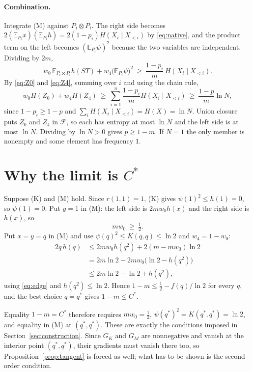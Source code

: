 \documentclass[aps,prd,twocolumn,superscriptaddress,nofootinbib,longbibliography,floatfix,amsmath,amssymb,10pt]{revtex4-2}
\theoremstyle{plain}
\theoremstyle{definition}
\theoremstyle{plain}
\newcommand{\EE}{\mathbb{E}}
\newcommand{\cF}{\mathcal{F}}
\newcommand{\qs}{q^{*}}
\newcommand{\Cs}{C^{*}}
\begin{document}
\paragraph*{Combination.} Integrate (M) against $P_i\otimes P_i$. The right side becomes $2(\EE_{P_i}x)(\EE_{P_i}h)=2(1-p_i)H(X_i\mid X_{<i})$ by \eqref{eq:native}, and the product term on the left becomes $(\EE_{P_i}\psi)^2$ because the two variables are independent. Dividing by $2m$,
\[
w_0\,\EE_{P_i\otimes P_i}h(ST)+w_4\bigl(\EE_{P_i}\psi\bigr)^2\ \ge\ \frac{1-p_i}{m}\,H(X_i\mid X_{<i}).
\]
By \eqref{eq:Z0} and \eqref{eq:Z4}, summing over $i$ and using the chain rule,
\[
w_0H(Z_0)+w_4H(Z_4)\ \ge\ \sum_{i=1}^n\frac{1-p_i}{m}H(X_i\mid X_{<i})\ \ge\ \frac{1-p}{m}\ln N,
\]
since $1-p_i\ge 1-p$ and $\sum_iH(X_i\mid X_{<i})=H(X)=\ln N$. Union closure puts $Z_0$ and $Z_4$ in $\cF$, so each has entropy at most $\ln N$ and the left side is at most $\ln N$. Dividing by $\ln N>0$ gives $p\ge 1-m$. If $N=1$ the only member is nonempty and some element has frequency $1$.

\section{Why the limit is \texorpdfstring{$\Cs$}{C*}}\label{app:limit}

Suppose (K) and (M) hold. Since $r(1,1)=1$, (K) gives $\psi(1)^2\le h(1)=0$, so $\psi(1)=0$. Put $y=1$ in (M): the left side is $2mw_0h(x)$ and the right side is $h(x)$, so
\begin{equation}\label{eq:edge}
mw_0\ \ge\ \tfrac12 .
\end{equation}
Put $x=y=q$ in (M) and use $\psi(q)^2\le K(q,q)\le\ln 2$ and $w_4=1-w_0$:
\begin{align*}
2q\,h(q)&\le 2mw_0h(q^2)+2(m-mw_0)\ln 2\\
&= 2m\ln2-2mw_0\bigl(\ln2-h(q^2)\bigr)\\
&\le 2m\ln 2-\ln2+h(q^2),
\end{align*}
using \eqref{eq:edge} and $h(q^2)\le\ln 2$. Hence $1-m\le\frac12-f(q)/\ln2$ for every $q$, and the best choice $q=\qs$ gives $1-m\le\Cs$.

Equality $1-m=\Cs$ therefore requires $mw_0=\frac12$, $\psi(\qs)^2=K(\qs,\qs)=\ln 2$, and equality in (M) at $(\qs,\qs)$. These are exactly the conditions imposed in Section~\ref{sec:construction}. Since $G_K$ and $G_M$ are nonnegative and vanish at the interior point $(\qs,\qs)$, their gradients must vanish there too, so Proposition~\ref{prop:tangent} is forced as well; what has to be shown is the second-order condition.
\end{document}
